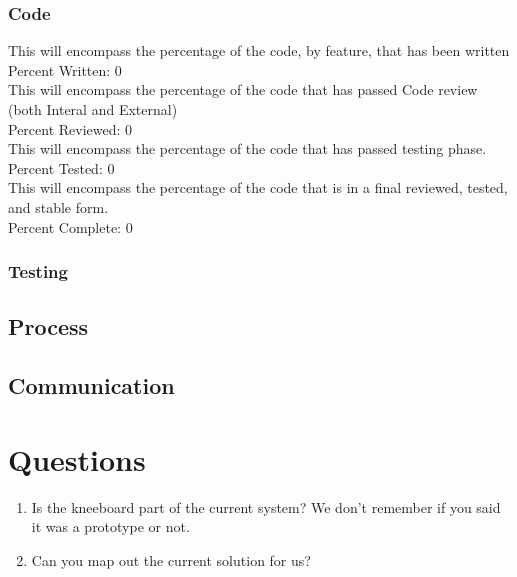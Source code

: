 \documentclass{article}
\begin{document}
\subsubsection{Code}
This will encompass the percentage of the code, by feature, that has been written\\
Percent Written:	0\\
This will encompass the percentage of the code that has passed Code review (both Interal and External)\\
Percent Reviewed:	0\\
This will encompass the percentage of the code that has passed testing phase.\\
Percent Tested:		0\\
This will encompass the percentage of the code that is in a final reviewed, tested, and stable form.\\
Percent Complete:	0\\


\subsubsection{Testing}
\subsection{Process}
\subsection{Communication}

\clearpage

\section{Questions}

\begin{enumerate}[label*=6.\arabic*]
\item Is the kneeboard part of the current system? We don't remember if you said it was a prototype or not.
\item Can you map out the current solution for us?

\end{enumerate}
\end{document}
